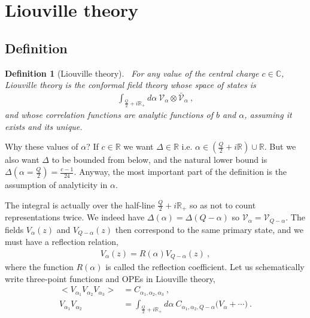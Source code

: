 \documentclass[12pt, a4paper]{article}
\theoremstyle{break}
\newtheorem{defn}[exo]{Definition}
\begin{document}
\section{Liouville theory}

\subsection{Definition}

\begin{defn}[Liouville theory]
 ~\label{def:liou}
 For any value of the central charge $c\in\mathbb{C}$, Liouville theory is the conformal field theory whose space of states is
 \begin{align}
  \int_{\frac{Q}{2}+i\mathbb{R}_+}  d\alpha\ \mathcal V_\alpha \otimes 
   \bar{\mathcal V}_\alpha\ , 
 \end{align}
and whose correlation functions are analytic functions of $b$ and $\alpha$, assuming it exists and its unique.
\end{defn}
Why these values of $\alpha$? If $c\in \mathbb{R}$ we want $\Delta\in\mathbb{R}$ i.e. $\alpha\in (\frac{Q}{2}+i\mathbb{R}) \cup \mathbb{R}$. But we also want $\Delta$ to be bounded from below, and the natural lower bound is  $\Delta(\alpha=\frac{Q}{2}) =\frac{c-1}{24}$. 
Anyway, the most important part of the definition is the assumption of analyticity in $\alpha$.

The integral is actually over the half-line $\frac{Q}{2}+i\mathbb{R}_+$ so as not to count representations twice.
We indeed have $\Delta(\alpha)=\Delta(Q-\alpha)$ so $\mathcal{V}_\alpha = \mathcal{V}_{Q-\alpha}$.
The fields $V_\alpha(z)$ and $V_{Q-\alpha}(z)$ then correspond to the same primary state, and we must have a reflection relation, 
\begin{align}
 V_\alpha(z) = R(\alpha) V_{Q-\alpha}(z)\ ,
\end{align}
where the function $R(\alpha)$ is called the reflection coefficient.
Let us schematically write three-point functions and OPEs in Liouville theory, 
\begin{align}
 \Big< V_{\alpha_1}V_{\alpha_2}V_{\alpha_3} \Big> & = C_{\alpha_1,\alpha_2,\alpha_3} 
 \ ,
 \\
 V_{\alpha_1}V_{\alpha_2} &= \int_{\frac{Q}{2}+i\mathbb{R}_+} d\alpha\ C_{\alpha_1,\alpha_2,Q-\alpha} \Big( V_\alpha + \cdots\Big)\ .
 \label{eq:v1v2}
\end{align}
\end{document}
